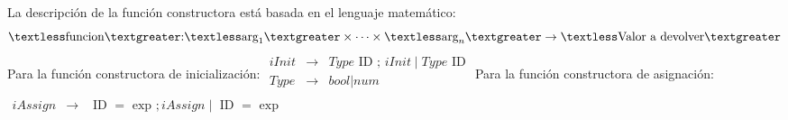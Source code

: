 \documentclass{article}
\begin{document}
La descripción de la función constructora está basada en el lenguaje matemático:
$$
	\textless\text{funcion}\textgreater\text:\textless\text{arg}_1\textgreater\times\cdots\times\textless\text{arg}_n\textgreater\rightarrow\textless\text{Valor a devolver}\textgreater
$$
Para la función constructora de inicialización:\newline
$
\begin{array}{lcl}
iInit & \rightarrow & Type\text{ ID ; }iInit \mid Type\text{ ID} \\
Type & \rightarrow & bool | num \\
\end{array}
$
\newline
Para la función constructora de asignación:\newline
$
\begin{array}{lcl}
iAssign & \rightarrow & \text{ ID } = \text{ exp }; iAssign \mid \text{ ID } = \text{ exp } \\
\end{array}
$\newline
\end{document}
